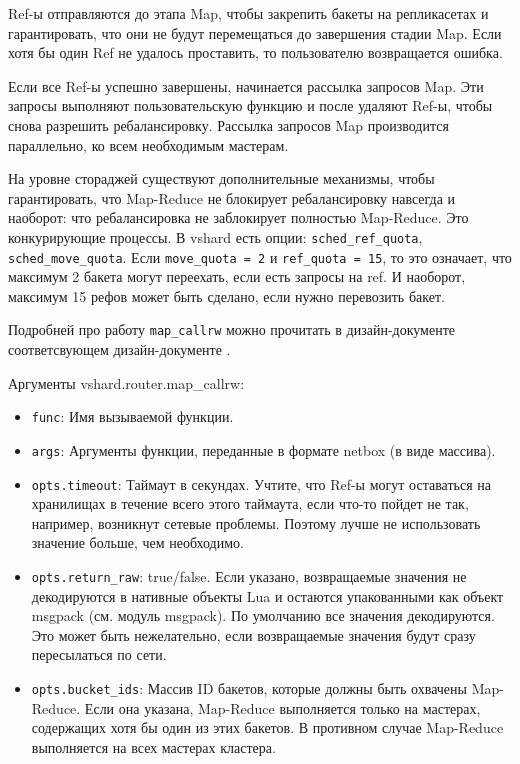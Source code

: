 Ref-ы отправляются до этапа Map, чтобы закрепить бакеты на репликасетах и
гарантировать, что они не будут перемещаться до завершения стадии Map. Если
хотя бы один Ref не удалось проставить, то пользователю возвращается ошибка.

Если все Ref-ы успешно завершены, начинается рассылка запросов Map. Эти запросы
выполняют пользовательскую функцию и после удаляют Ref-ы, чтобы снова разрешить
ребалансировку. Рассылка запросов Map производится параллельно, ко всем
необходимым мастерам.

На уровне стораджей существуют дополнительные механизмы, чтобы гарантировать,
что Map-Reduce не блокирует ребалансировку навсегда и наоборот: что
ребалансировка не заблокирует полностью Map-Reduce. Это конкурирующие процессы.
В vshard есть опции: \texttt{sched\_ref\_quota}, \texttt{sched\_move\_quota}.
Если \texttt{move\_quota = 2} и \texttt{ref\_quota = 15}, то это означает, что
максимум 2 бакета могут переехать, если есть запросы на ref. И наоборот,
максимум 15 рефов может быть сделано, если нужно перевозить бакет.

Подробней про работу \texttt{map\_callrw} можно прочитать в дизайн-документе
соответсвующем дизайн-документе \cite{MapCallrwRfc}.

Аргументы vshard.router.map\_callrw:

\begin{itemize}
\item \texttt{func}: Имя вызываемой функции.
\item \texttt{args}: Аргументы функции, переданные в формате netbox (в виде
    массива).
\item \texttt{opts.timeout}: Таймаут в секундах. Учтите, что Ref-ы могут
    оставаться на хранилищах в течение всего этого таймаута, если что-то пойдет
        не так, например, возникнут сетевые проблемы. Поэтому лучше не
        использовать значение больше, чем необходимо.
\item \texttt{opts.return\_raw}: true/false. Если указано, возвращаемые
    значения не декодируются в нативные объекты Lua и остаются упакованными как
        объект msgpack (см. модуль msgpack). По умолчанию все значения
        декодируются. Это может быть нежелательно, если возвращаемые значения
        будут сразу пересылаться по сети.
\item \texttt{opts.bucket\_ids}: Массив ID бакетов, которые должны быть
    охвачены Map-Reduce. Если она указана, Map-Reduce выполняется только на
        мастерах, содержащих хотя бы один из этих бакетов. В противном случае
        Map-Reduce выполняется на всех мастерах кластера.
\end{itemize}

